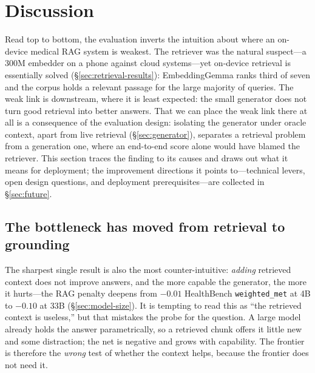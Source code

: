 \section{Discussion}
\label{sec:discussion}

Read top to bottom, the evaluation inverts the intuition about where an
on-device medical RAG system is weakest. The retriever was the natural
suspect---a 300M embedder on a phone against cloud systems---yet on-device
retrieval is essentially solved (\S\ref{sec:retrieval-results}): EmbeddingGemma
ranks third of seven and the corpus holds a relevant passage for the large
majority of queries. The weak link is downstream, where it is least expected:
the small generator does not turn good retrieval into better answers. That we
can place the weak link there at all is a consequence of the evaluation design:
isolating the generator under oracle context, apart from live retrieval
(\S\ref{sec:generator}), separates a retrieval problem from a generation one,
where an end-to-end score alone would have blamed the retriever. This section
traces the finding to its causes and draws out what it means for deployment; the
improvement directions it points to---technical levers, open design questions,
and deployment prerequisites---are collected in \S\ref{sec:future}.

\subsection{The bottleneck has moved from retrieval to grounding}

The sharpest single result is also the most counter-intuitive: \emph{adding}
retrieved context does not improve answers, and the more capable the generator,
the more it hurts---the RAG penalty deepens from $-0.01$ HealthBench
\texttt{weighted\_met} at 4B to $-0.10$ at 33B (\S\ref{sec:model-size}). It is
tempting to read this as ``the retrieved context is useless,'' but that mistakes
the probe for the question. A large model already holds the answer
parametrically, so a retrieved chunk offers it little new and some distraction;
the net is negative and grows with capability. The frontier is therefore the
\emph{wrong} test of whether the context helps, because the frontier does not
need it.


